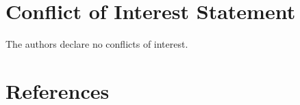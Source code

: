 \documentclass[
  american,
  man, donotrepeattitle,floatsintext]{apa7}
\begin{document}
\section*{Conflict of Interest Statement}\label{conflict-of-interest-statement}

The authors declare no conflicts of interest.

\section*{References}\label{references}

\begingroup
\singlespacing
\setlength{\parindent}{-0.5in}
\setlength{\leftskip}{0.5in}

\protect{}\label{refs}
\end{document}

